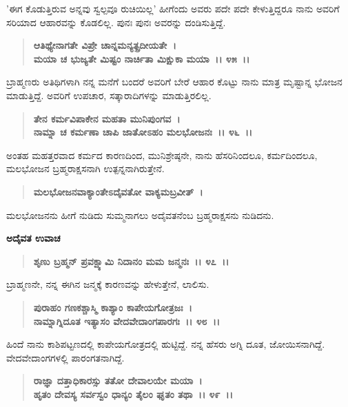 'ಈಗ ಕೊಡುತ್ತಿರುವ ಅನ್ನವು ಸ್ವಲ್ಪವೂ ರುಚಿಯಿಲ್ಲ' ಹೀಗೆಂದು ಅವರು ಪದೇ ಪದೇ ಕೇಳುತ್ತಿದ್ದರೂ ನಾನು ಅವರಿಗೆ ಸರಿಯಾದ ಆಹಾರವನ್ನು ಕೊಡಲಿಲ್ಲ. ಪುನಃ ಪುನಃ ಅವರನ್ನು ದಂಡಿಸುತ್ತಿದ್ದೆ.

\begin{verse}
\textbf{ಆತಿಥ್ಯೇನಾಗತೇ ವಿಪ್ರೇ ಚಾನ್ನಮನ್ಯತ್ಪ್ರದೀಯತೇ~।}\\\textbf{ಮಯಾ ಚ ಭುಜ್ಯತೇ ಮಿಷ್ಟಂ ನಾರ್ಚಿತಾ ಮಿಕ್ಷುಕಾ ಮಯಾ~।। ೪೫~।।}
\end{verse}

ಬ್ರಾಹ್ಮಣರು ಅತಿಥಿಗಳಾಗಿ ನನ್ನ ಮನೆಗೆ ಬಂದರೆ ಅವರಿಗೆ ಬೇರೆ ಆಹಾರ ಕೊಟ್ಟು ನಾನು ಮಾತ್ರ ಮೃಷ್ಟಾನ್ನ ಭೋಜನ ಮಾಡುತ್ತಿದ್ದೆ. ಅವರಿಗೆ ಉಪಚಾರ, ಸತ್ಕಾರಾದಿಗಳನ್ನು ಮಾಡುತ್ತಿರಲಿಲ್ಲ.

\begin{verse}
\textbf{ತೇನ ಕರ್ಮವಿಪಾಕೇನ ಮಹತಾ ಮುನಿಪುಂಗವ~।}\\\textbf{ನಾಮ್ನಾ ಚ ಕರ್ಮಣಾ ಚಾಪಿ ಜಾತೋಽಹಂ ಮಲಭೋಜನಃ~।। ೪೬~।।}
\end{verse}

ಅಂತಹ ಮಹತ್ತರವಾದ ಕರ್ಮದ ಕಾರಣದಿಂದ, ಮುನಿಶ್ರೇಷ್ಠನೇ, ನಾನು ಹೆಸರಿನಿಂದಲೂ, ಕರ್ಮದಿಂದಲೂ, ಮಲಭೋಜನ ಬ್ರಹ್ಮರಾಕ್ಷಸನಾಗಿ ಉತ್ಪನ್ನನಾಗಿರುತ್ತೇನೆ.

\begin{verse}
\textbf{ಮಲಭೋಜನವಾಕ್ಯಾಂತೇಽದೈವತೋ ವಾಕ್ಯಮಬ್ರವೀತ್~।}
\end{verse}

ಮಲಭೋಜನನು ಹೀಗೆ ನುಡಿದು ಸುಮ್ಮನಾಗಲು ಅದೈವತನೆಂಬ ಬ್ರಹ್ಮರಾಕ್ಷಸನು ನುಡಿದನು.

\begin{flushleft}
\textbf{ಅದೈವತ ಉವಾಚ}
\end{flushleft}

\begin{verse}
\textbf{ಶೃಣು ಬ್ರಹ್ಮನ್ ಪ್ರವಕ್ಷ್ಯಾಮಿ ನಿದಾನಂ ಮಮ ಜನ್ಮನಃ~।। ೪೭~।।}
\end{verse}

ಬ್ರಾಹ್ಮಣನೇ, ನನ್ನ ಈಗಿನ ಜನ್ಮಕ್ಕೆ ಕಾರಣವನ್ನು ಹೇಳುತ್ತೇನೆ, ಲಾಲಿಸು.

\begin{verse}
\textbf{ಪುರಾಹಂ ಗಣಕಶ್ಚಾಸ್ಮಿ ಕಾಶ್ಯಾಂ ಕಾಪೇಯಗೋತ್ರಜಃ~।}\\\textbf{ನಾಮ್ನಾಗ್ನಿದೂತ ಇತ್ಯಾಸಂ ವೇದವೇದಾಂಗಪಾರಗಃ~।। ೪೮~।।}
\end{verse}

ಹಿಂದೆ ನಾನು ಕಾಶಿಪಟ್ಟಣದಲ್ಲಿ ಕಾಪೇಯಗೋತ್ರದಲ್ಲಿ ಹುಟ್ಟಿದ್ದೆ. ನನ್ನ ಹೆಸರು ಅಗ್ನಿ ದೂತ, ಜೋಯಿಸನಾಗಿದ್ದೆ. ವೇದವೇದಾಂಗಗಳಲ್ಲಿ ಪಾರಂಗತನಾಗಿದ್ದೆ.

\begin{verse}
\textbf{ರಾಜ್ಞಾ ದತ್ತಾಧಿಕಾರಸ್ಸು ತತೋ ದೇವಾಲಯೇ ಮಯಾ~।}\\\textbf{ಹೃತಂ ದೇವಸ್ಯ ಸರ್ವಸ್ವಂ ಧಾನ್ಯಂ ತೈಲಂ ಘೃತಂ ತಥಾ~।। ೪೯~।। }
\end{verse}


